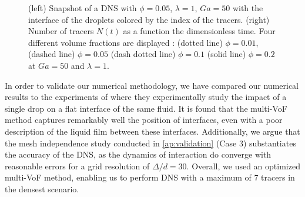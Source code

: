 \begin{figure}[h!]
    \centering
    \caption{
    (left) Snapshot of a DNS with $\phi = 0.05$, $\lambda = 1$, $Ga = 50$ with the interface of the droplets colored by the index of the tracers.
    (right) Number of tracers $N(t)$ as a function the dimensionless time.
    Four different volume fractions are displayed : (dotted line) $\phi = 0.01$, (dashed line) $\phi = 0.05$ (dash dotted line) $\phi = 0.1$ (solid line) $\phi = 0.2$ at $Ga = 50$ and $\lambda = 1$. 
    }
    \label{fig:diagram}
\end{figure}


In order to validate our numerical methodology, we have compared our numerical results to the experiments of \citet{mohamed2003drop} where they experimentally study the impact of a single drop on a flat interface of the same fluid. %
It is found that the multi-VoF method captures remarkably well the position of interfaces, even with a poor description of the liquid film between these interfaces.
Additionally, we argue that the mesh independence study conducted in \ref{ap:validation} (Case 3) substantiates the accuracy of the DNS, as the dynamics of interaction do converge with  reasonable errors for a grid resolution of $\Delta/d = 30$. 
Overall, we used an optimized multi-VoF method, enabling us to perform DNS with a maximum of 7 tracers in the densest scenario.
 





